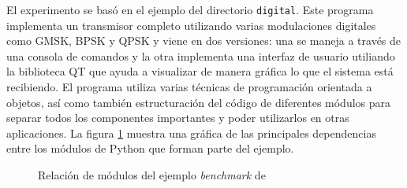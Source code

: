 El experimento se bas\'o en el ejemplo del directorio \verb|digital|. Este programa implementa un
transmisor completo utilizando varias modulaciones digitales como GMSK, BPSK y QPSK y viene en dos
versiones: una se maneja a trav\'es de una consola de comandos y la otra implementa una interfaz de
usuario utiliando la biblioteca QT que ayuda a visualizar de manera gr\'afica lo que el sistema est\'a
recibiendo. El programa utiliza varias t\'ecnicas de programaci\'on orientada a objetos, as\'i como
tambi\'en estructuraci\'on del c\'odigo de diferentes m\'odulos para separar todos los componentes
importantes y poder utilizarlos en otras aplicaciones. La figura \ref{fig:relbench} muestra una gr\'afica
de las principales dependencias entre los m\'odulos de Python que forman parte del ejemplo.

\begin{figure}[htp]
\centering
{}
\vspace{0.5in}
\caption{Relaci\'on de m\'odulos del ejemplo \emph{benchmark} de \gnuradio}
\label{fig:relbench}
\end{figure}

